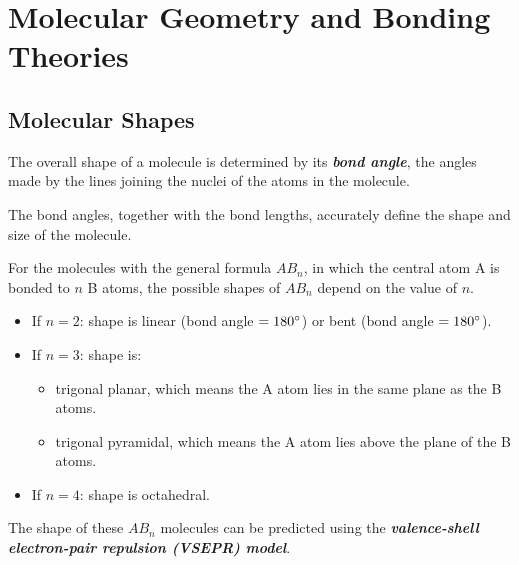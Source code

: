 \documentclass[12pt, a4paper]{report}
\newcommand{\impt}[1]{\textbf{\textit{#1}}}
\newcommand{\hi}{\section}
\begin{document}
\chapter{Molecular Geometry and Bonding Theories}

\hi{Molecular Shapes}
    \par The overall shape of a molecule is determined by its \impt{bond angle}, the angles made by
    the lines joining the nuclei of the atoms in the molecule.
    \par The bond angles, together with the bond lengths, accurately define the shape and size
    of the molecule.
    \par For the molecules with the general formula $AB_{n}$, in which the central atom A is
    bonded to $n$ B atoms, the possible shapes of $AB_{n}$ depend on the value of $n$.
    \begin{itemize}
        \item If $n = 2$: shape is linear (bond angle $= 180 \degree$) or bent
            (bond angle $= 180 \degree$).
        \item If $n = 3$: shape is:
            \begin{itemize}
                \item trigonal planar, which means the A atom lies in the same plane as the B atoms.
                \item trigonal pyramidal, which means the A atom lies above the plane of the B atoms.
            \end{itemize}
        \item If $n = 4$: shape is octahedral.
    \end{itemize}
    \par The shape of these $AB_{n}$ molecules can be predicted using the \impt{valence-shell
    electron-pair repulsion (VSEPR) model}.
\end{document}
